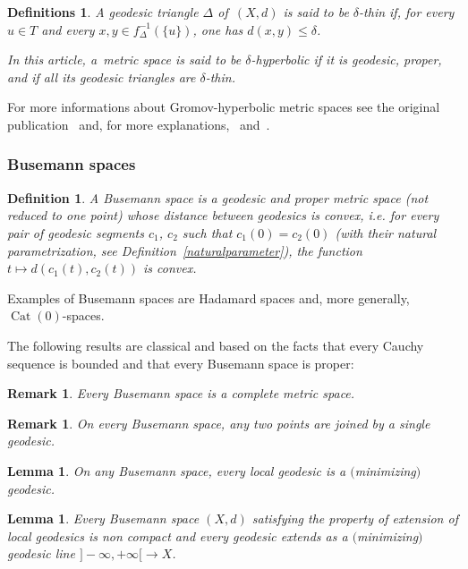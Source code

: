 \documentclass[pdftex]{sigma}
\numberwithin{equation}{section}
\newtheorem{Lemma}[theor]{Lemma}
\newtheorem{defi}[theor]{Definition}
\newtheorem{defis}[theor]{Definitions}
\newtheorem{Remark}[theor]{Remark}
\newcommand{\Cat}{\operatorname{Cat}}
\begin{document}
\begin{defis}\label{hypdefinition0}
A geodesic triangle $\Delta$ of~$(X,d)$ is said to be $\delta$-thin if, for every $u \in T$ and every $x, y \in f_\Delta^{-1} (\{u\})$, one has $d(x,y) \le
\delta$.

In this article, a~metric space is said to be $\delta$-hyperbolic if it is geodesic, proper, and if all its geodesic triangles are $\delta$-thin.
\end{defis}

For more informations about Gromov-hyperbolic metric spaces see the original publication~\cite{Gr4} and, for more explanations,~\cite{CDP,GH} and~\cite{BH}.

\subsubsection{Busemann spaces}\label{Busemannspaces}

\begin{defi}%
A Busemann space is a geodesic and proper metric space (not reduced to one point) whose distance between geodesics is convex, i.e. for every pair
 of geodesic segments $c_1$, $c_2 $ such that $c_1 (0) = c_2 (0)$ (with their natural parametrization, see Definition~\ref{naturalparameter}),
the
function $t \mapsto d(c_1(t), c_2 (t))$ is convex.
\end{defi}

Examples of Busemann spaces are Hadamard spaces and, more generally, $\Cat (0)$-spaces.

\medskip

The following results are classical and based on the facts that every Cauchy sequence is bounded and that every Busemann space is proper:

\begin{Remark}%
Every Busemann space is a complete metric space.
\end{Remark}

\begin{Remark}%
On every Busemann space, any two points are joined by a single geodesic.
\end{Remark}

\begin{Lemma}%
On any Busemann space, every local geodesic is a $($minimizing$)$ geodesic.
\end{Lemma}

\begin{Lemma}%
Every Busemann space $(X,d)$ satisfying the property of extension of local geo\-de\-sics is non compact and every geo\-de\-sic extends as
a $($minimizing$)$ geodesic line $ ]{-} \infty, +\infty [ {}\to X$.
\end{Lemma}
\end{document}
